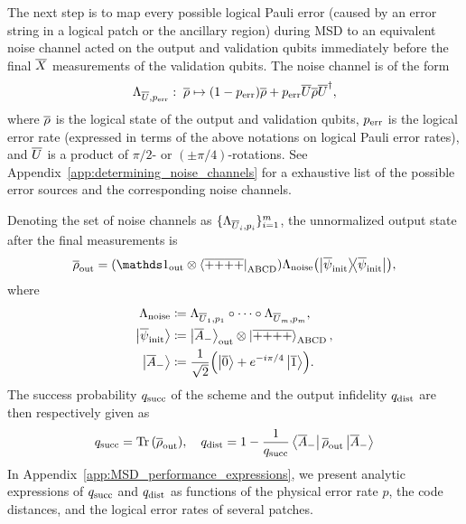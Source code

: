\documentclass[
 prx,
 reprint,
 superscriptaddress,
 longbibliography,
 dvipsnames
]{revtex4-2}
\begin{document}
The next step is to map every possible logical Pauli error (caused by an error string in a logical patch or the ancillary region) during MSD to an equivalent noise channel acted on the output and validation qubits immediately before the final $\overline{X}$ measurements of the validation qubits.
The noise channel is of the form
\begin{align*}
    \Lambda_{\overline{U},p_{\mathrm{err}}}: \; \overline{\rho} \mapsto (1 - p_{\mathrm{err}})\overline{\rho} + p_{\mathrm{err}} \overline{U} \overline{\rho} \overline{U}^\dagger,
\end{align*}
where $\overline{\rho}$ is the logical state of the output and validation qubits, $p_{\mathrm{err}}$ is the logical error rate (expressed in terms of the above notations on logical Pauli error rates), and $\overline{U}$ is a product of $\pi/2$- or $(\pm \pi/4)$-rotations.
See Appendix~\ref{app:determining_noise_channels} for a exhaustive list of the possible error sources and the corresponding noise channels.

Denoting the set of noise channels as $\{\Lambda_{\overline{U}_i, p_i}\}_{i=1}^{m}$, the unnormalized output state after the final measurements is
\begin{align*}
    \lgc{\rho}_\mr{out} = (\identity_\mr{out} \otimes \bra{\lgc{+}\lgc{+}\lgc{+}\lgc{+}}_\mr{ABCD}) \Lambda_\mr{noise} \qty(\ketbra{\lgc{\psi}_\mr{init}}),
\end{align*}
where
\begin{align*}
    \Lambda_{\mathrm{noise}} &\coloneqq \Lambda_{\overline{U}_1,p_1} \circ \cdots \circ \Lambda_{\overline{U}_m,p_m}, \\
    \ket{\overline{\psi}_{\mathrm{init}}} &\coloneqq \ket{\overline{A}_-}_{\mathrm{out}} \otimes \ket{\overline{+}\overline{+}\overline{+}\overline{+}}_{\mathrm{ABCD}}, \\
    \ket{\overline{A}_-} &\coloneqq \frac{1}{\sqrt{2}} \qty(\ket{\overline{0}} + e^{-i\pi/4}\ket{\overline{1}}).
\end{align*}
The success probability $q_{\mathrm{succ}}$ of the scheme and the output infidelity $q_{\mathrm{dist}}$ are then respectively given as
\begin{align*}
    q_{\mathrm{succ}} = \Tr\qty(\overline{\rho}_{\mathrm{out}}), \quad
    q_{\mathrm{dist}} = 1 - \frac{1}{q_{\mathrm{succ}}} \bra{\overline{A}_-} \overline{\rho}_{\mathrm{out}} \ket{\overline{A}_-}
\end{align*}
In Appendix~\ref{app:MSD_performance_expressions}, we present analytic expressions of $q_{\mathrm{succ}}$ and $q_{\mathrm{dist}}$ as functions of the physical error rate $p$, the code distances, and the logical error rates of several patches.
\end{document}
